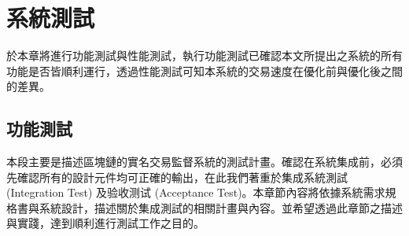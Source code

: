 \chapter{系統測試}
於本章將進行功能測試與性能測試，執行功能測試已確認本文所提出之系統的所有功能是否皆順利運行，透過性能測試可知本系統的交易速度在優化前與優化後之間的差異。
	\section{功能測試}
	 	本段主要是描述區塊鏈的實名交易監督系統的測試計畫。確認在系統集成前，必須先確認所有的設計元件均可正確的輸出，在此我們著重於集成系統測試 (Integration Test) 及验收测试 (Acceptance Test)。本章節內容將依據系統需求規格書與系統設計，描述關於集成測試的相關計畫與內容。並希望透過此章節之描述與實踐，達到順利進行測試工作之目的。
